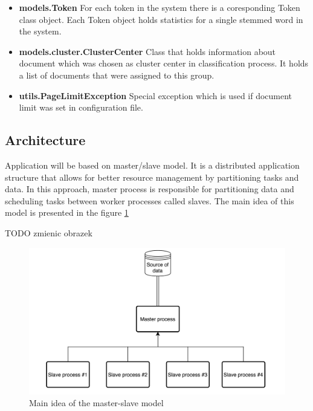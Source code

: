 \begin{itemize}
	\item \textbf{models.Token}\newline
	For each token in the system there is a coresponding Token class object. Each Token object holds statistics for a single stemmed word in the system.
	
	\item \textbf{models.cluster.ClusterCenter}\newline
	Class that holds information about document which was chosen as cluster center in classification process. It holds a list of documents that were assigned to this group.
	
	\item \textbf{utils.PageLimitException}\newline
	Special exception which is used if document limit was set in configuration file.
\end{itemize}

\subsection{Architecture}
Application will be based on master/slave model. It is a distributed application structure that allows for better resource management by partitioning tasks and data. In this approach, master process is responsible for partitioning data and scheduling tasks between worker processes called slaves. The main idea of this model is presented in the figure \ref{design-architecture}

TODO zmienic obrazek
\begin{figure}[H]
	\begin{center}
		\includegraphics[width=1.0\linewidth]{images/diagrams/architecture.png}
		\caption{Main idea of the master-slave model}
		\label{design-architecture}
	\end{center}
\end{figure}

